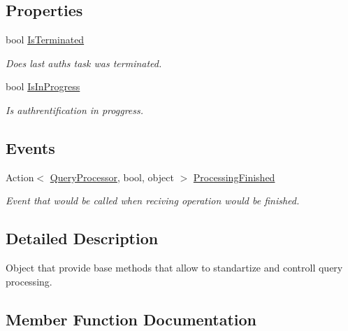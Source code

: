 \subsection*{Properties}
\begin{DoxyCompactItemize}
\item 
bool \mbox{\hyperlink{class_uniform_queries_1_1_executable_1_1_query_processor_a6782b3a610851ec2eabb04b43172b7e0}{Is\+Terminated}}
\begin{DoxyCompactList}\small\item\em Does last auth\textquotesingle{}s task was terminated. \end{DoxyCompactList}\item 
bool \mbox{\hyperlink{class_uniform_queries_1_1_executable_1_1_query_processor_aef7bc3b54884fa1c4f95af2fd542b6c0}{Is\+In\+Progress}}
\begin{DoxyCompactList}\small\item\em Is authrentification in proggress. \end{DoxyCompactList}\end{DoxyCompactItemize}
\subsection*{Events}
\begin{DoxyCompactItemize}
\item 
Action$<$ \mbox{\hyperlink{class_uniform_queries_1_1_executable_1_1_query_processor}{Query\+Processor}}, bool, object $>$ \mbox{\hyperlink{class_uniform_queries_1_1_executable_1_1_query_processor_a87f6d66a2f0bdd9ff0c0a3e66e716efe}{Processing\+Finished}}
\begin{DoxyCompactList}\small\item\em Event that would be called when reciving operation would be finished. \end{DoxyCompactList}\end{DoxyCompactItemize}


\subsection{Detailed Description}
Object that provide base methods that allow to standartize and controll query processing. 



\subsection{Member Function Documentation}
\mbox{\label{class_uniform_queries_1_1_executable_1_1_query_processor_abe2a2292006829ba3b715b1cfe19f9cb}} 
